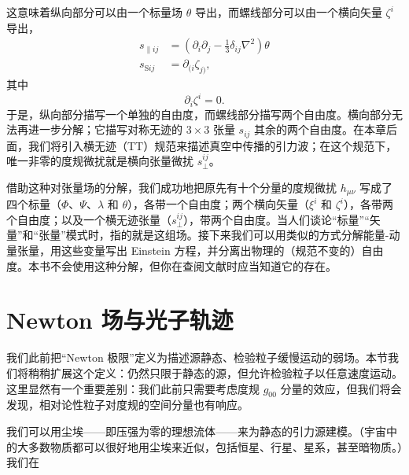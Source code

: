 这意味着纵向部分可以由一个标量场 $\theta$ 导出，而螺线部分可以由一个横向矢量 $\zeta^{i}$ 导出，
\begin{align*}
s_{\parallel ij} &= \left(\partial_{i}\partial_{j} - \frac{1}{3}\delta_{ij}\nabla^{2}\right)\theta \\
s_{\mathrm{S}ij} &= \partial_{(i}\zeta_{j)},
\tag{7.52}
\end{align*}
其中
\begin{equation*}
\partial_{i}\zeta^{i} = 0.
\tag{7.53}
\end{equation*}
于是，纵向部分描写一个单独的自由度，而螺线部分描写两个自由度。横向部分无法再进一步分解；它描写对称无迹的 $3 \times 3$ 张量 $s_{ij}$ 其余的两个自由度。在本章后面，我们将引入横无迹（TT）规范来描述真空中传播的引力波；在这个规范下，唯一非零的度规微扰就是横向张量微扰 $s_{\perp}^{ij}$。

借助这种对张量场的分解，我们成功地把原先有十个分量的度规微扰 $h_{\mu\nu}$ 写成了四个标量（$\Phi$、$\Psi$、$\lambda$ 和 $\theta$），各带一个自由度；两个横向矢量（$\xi^{i}$ 和 $\zeta^{i}$），各带两个自由度；以及一个横无迹张量（$s_{\perp}^{ij}$），带两个自由度。当人们谈论“标量”“矢量”和“张量”模式时，指的就是这组场。接下来我们可以用类似的方式分解能量-动量张量，用这些变量写出 Einstein 方程，并分离出物理的（规范不变的）自由度。本书不会使用这种分解，但你在查阅文献时应当知道它的存在。

\section{Newton 场与光子轨迹}

我们此前把“Newton 极限”定义为描述源静态、检验粒子缓慢运动的弱场。本节我们将稍稍扩展这个定义：仍然只限于静态的源，但允许检验粒子以任意速度运动。这里显然有一个重要差别：我们此前只需要考虑度规 $g_{00}$ 分量的效应，但我们将会发现，相对论性粒子对度规的空间分量也有响应。

我们可以用尘埃——即压强为零的理想流体——来为静态的引力源建模。（宇宙中的大多数物质都可以很好地用尘埃来近似，包括恒星、行星、星系，甚至暗物质。）我们在
